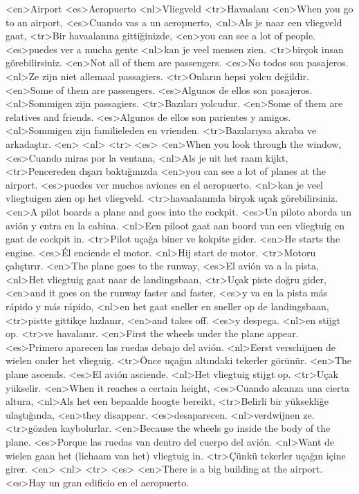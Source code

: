 <en>Airport
<es>Aeropuerto
<nl>Vliegveld 
<tr>Havaalanı
<en>When you go to an airport,
<es>Cuando vas a un aeropuerto,
<nl>Als je naar een vliegveld gaat,
<tr>Bir havaalanına gittiğinizde,
<en>you can see a lot of people.
<es>puedes ver a mucha gente
<nl>kan je veel mensen zien.
<tr>birçok insan görebilirsiniz.
<en>Not all of them are passengers.
<es>No todos son pasajeros.
<nl>Ze zijn niet allemaal passagiers.
<tr>Onların hepsi yolcu değildir.
<en>Some of them are passengers.
<es>Algunos de ellos son pasajeros.
<nl>Sommigen zijn passagiers.
<tr>Bazıları yolcudur.
<en>Some of them are relatives and friends.
<es>Algunos de ellos son parientes y amigos.
<nl>Sommigen zijn familieleden en vrienden.
<tr>Bazılarıysa akraba ve arkadaştır.
<en>
<nl>
<tr>
<es>
<en>When you look through the window,
<es>Cuando miras por la ventana,
<nl>Als je uit het raam kijkt, 
<tr>Pencereden dışarı baktığınızda
<en>you can see a lot of planes at the airport.
<es>puedes ver muchos aviones en el aeropuerto.
<nl>kan je veel vliegtuigen zien op het vliegveld.
<tr>havaalanında birçok uçak görebilirsiniz.
<en>A pilot boards a plane and goes into the cockpit.
<es>Un piloto aborda un avión y entra en la cabina.
<nl>Een piloot gaat aan boord van een vliegtuig en gaat de cockpit in.
<tr>Pilot uçağa biner ve kokpite gider.
<en>He starts the engine.
<es>Él enciende el motor.
<nl>Hij start de motor.
<tr>Motoru çalıştırır.
<en>The plane goes to the runway,
<es>El avión va a la pista,
<nl>Het vliegtuig gaat naar de landingsbaan,
<tr>Uçak piste doğru gider, 
<en>and it goes on the runway faster and faster,
<es>y va en la pista más rápido y más rápido,
<nl>en het gaat sneller en sneller op de landingsbaan,
<tr>pistte gittikçe hızlanır,
<en>and takes off.
<es>y despega.
<nl>en stijgt op.
<tr>ve havalanır.
<en>First the wheels under the plane appear.
<es>Primero aparecen las ruedas debajo del avión.
<nl>Eerst verschijnen de wielen onder het vlieguig.
<tr>Önce uçağın altındaki tekerler görünür.
<en>The plane ascends.
<es>El avión asciende.
<nl>Het vliegtuig stijgt op.
<tr>Uçak yükselir.
<en>When it reaches a certain height,
<es>Cuando alcanza una cierta altura,
<nl>Als het een bepaalde hoogte bereikt, 
<tr>Belirli bir yüksekliğe ulaştığında,
<en>they disappear.
<es>desaparecen.
<nl>verdwijnen ze.
<tr>gözden kaybolurlar.
<en>Because the wheels go inside the body of the plane.
<es>Porque las ruedas van dentro del cuerpo del avión.
<nl>Want de wielen gaan het (lichaam van het) vliegtuig in.
<tr>Çünkü tekerler uçağın içine girer.
<en>
<nl>
<tr>
<es>
<en>There is a big building at the airport.
<es>Hay un gran edificio en el aeropuerto.
